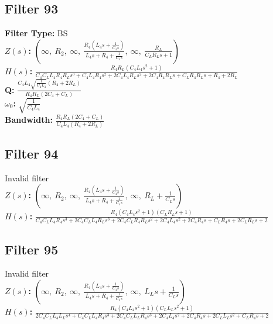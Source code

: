 \documentclass{article}
\begin{document}
\subsection*{Filter 93}
\textbf{Filter Type:} BS \\ 
\textbf{$Z(s)$:} $\left( \infty, \  R_{2}, \  \infty, \  \frac{R_{4} \left(L_{4} s + \frac{1}{C_{4} s}\right)}{L_{4} s + R_{4} + \frac{1}{C_{4} s}}, \  \infty, \  \frac{R_{L}}{C_{L} R_{L} s + 1}\right)$ \\ 
\textbf{$H(s)$:} $\frac{R_{4} R_{L} \left(C_{4} L_{4} s^{2} + 1\right)}{C_{4} C_{L} L_{4} R_{4} R_{L} s^{3} + C_{4} L_{4} R_{4} s^{2} + 2 C_{4} L_{4} R_{L} s^{2} + 2 C_{4} R_{4} R_{L} s + C_{L} R_{4} R_{L} s + R_{4} + 2 R_{L}}$ \\ 
\textbf{Q:} $\frac{C_{4} L_{4} \sqrt{\frac{1}{C_{4} L_{4}}} \left(R_{4} + 2 R_{L}\right)}{R_{4} R_{L} \left(2 C_{4} + C_{L}\right)}$ \\ 
\textbf{$\omega_0$:} $\sqrt{\frac{1}{C_{4} L_{4}}}$ \\ 
\textbf{Bandwidth:} $\frac{R_{4} R_{L} \left(2 C_{4} + C_{L}\right)}{C_{4} L_{4} \left(R_{4} + 2 R_{L}\right)}$ \\ 
\subsection*{Filter 94}
Invalid filter \\ 
\textbf{$Z(s)$:} $\left( \infty, \  R_{2}, \  \infty, \  \frac{R_{4} \left(L_{4} s + \frac{1}{C_{4} s}\right)}{L_{4} s + R_{4} + \frac{1}{C_{4} s}}, \  \infty, \  R_{L} + \frac{1}{C_{L} s}\right)$ \\ 
\textbf{$H(s)$:} $\frac{R_{4} \left(C_{4} L_{4} s^{2} + 1\right) \left(C_{L} R_{L} s + 1\right)}{C_{4} C_{L} L_{4} R_{4} s^{3} + 2 C_{4} C_{L} L_{4} R_{L} s^{3} + 2 C_{4} C_{L} R_{4} R_{L} s^{2} + 2 C_{4} L_{4} s^{2} + 2 C_{4} R_{4} s + C_{L} R_{4} s + 2 C_{L} R_{L} s + 2}$ \\ 
\subsection*{Filter 95}
Invalid filter \\ 
\textbf{$Z(s)$:} $\left( \infty, \  R_{2}, \  \infty, \  \frac{R_{4} \left(L_{4} s + \frac{1}{C_{4} s}\right)}{L_{4} s + R_{4} + \frac{1}{C_{4} s}}, \  \infty, \  L_{L} s + \frac{1}{C_{L} s}\right)$ \\ 
\textbf{$H(s)$:} $\frac{R_{4} \left(C_{4} L_{4} s^{2} + 1\right) \left(C_{L} L_{L} s^{2} + 1\right)}{2 C_{4} C_{L} L_{4} L_{L} s^{4} + C_{4} C_{L} L_{4} R_{4} s^{3} + 2 C_{4} C_{L} L_{L} R_{4} s^{3} + 2 C_{4} L_{4} s^{2} + 2 C_{4} R_{4} s + 2 C_{L} L_{L} s^{2} + C_{L} R_{4} s + 2}$ \\ 
\end{document}
